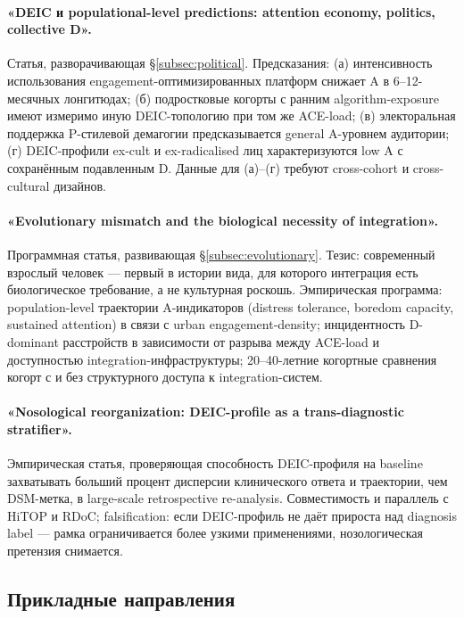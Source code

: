 \paragraph{«DEIC и populational-level predictions: attention economy, politics, collective D».} Статья, разворачивающая §\ref{subsec:political}. Предсказания: (а) интенсивность использования engagement-оптимизированных платформ снижает A в 6--12-месячных лонгитюдах; (б) подростковые когорты с ранним algorithm-exposure имеют измеримо иную DEIC-топологию при том же ACE-load; (в) электоральная поддержка P-стилевой демагогии предсказывается general A-уровнем аудитории; (г) DEIC-профили ex-cult и ex-radicalised лиц характеризуются low A с сохранённым подавленным D. Данные для (а)--(г) требуют cross-cohort и cross-cultural дизайнов.

\paragraph{«Evolutionary mismatch and the biological necessity of integration».} Программная статья, развивающая §\ref{subsec:evolutionary}. Тезис: современный взрослый человек --- первый в истории вида, для которого интеграция есть биологическое требование, а не культурная роскошь. Эмпирическая программа: population-level траектории A-индикаторов (distress tolerance, boredom capacity, sustained attention) в связи с urban engagement-density; инцидентность D-dominant расстройств в зависимости от разрыва между ACE-load и доступностью integration-инфраструктуры; 20--40-летние когортные сравнения когорт с и без структурного доступа к integration-систем.

\paragraph{«Nosological reorganization: DEIC-profile as a trans-diagnostic stratifier».} Эмпирическая статья, проверяющая способность DEIC-профиля на baseline захватывать больший процент дисперсии клинического ответа и траектории, чем DSM-метка, в large-scale retrospective re-analysis. Совместимость и параллель с HiTOP и RDoC; falsification: если DEIC-профиль не даёт прироста над diagnosis label --- рамка ограничивается более узкими применениями, нозологическая претензия снимается.

\subsection{Прикладные направления}

